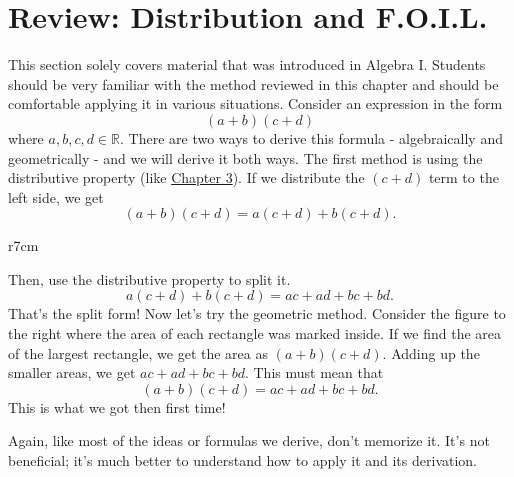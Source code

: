 \documentclass[lang=en,11pt]{elegantbook}
\begin{document}
\section{Review: Distribution and F.O.I.L.}
\noindent This section solely covers material that was introduced in Algebra I.  Students should be very familiar with the method reviewed in this chapter and should be comfortable applying it in various situations.  Consider an expression in the form $$(a+b)(c+d)$$ where $a,b,c,d\in\mathbb{R}$.  There are two ways to derive this formula - algebraically and geometrically - and we will derive it both ways.  The first method is using the distributive property (like \hyperlink{chapter.3}{Chapter 3}).  If we distribute the $(c+d)$ term to the left side, we get $$(a+b)(c+d)=a(c+d)+b(c+d).$$  

\begin{wrapfigure}{r}{7cm}
    \centering
{}
\end{wrapfigure}

Then, use the distributive property to split it.  $$a(c+d)+b(c+d)=ac+ad+bc+bd.$$  That's the split form!  Now let's try the geometric method.  Consider the figure to the right where the area of each rectangle was marked inside.  If we find the area of the largest rectangle, we get the area as $(a+b)(c+d)$.  Adding up the smaller areas, we get $ac+ad+bc+bd$.  This must mean that $$(a+b)(c+d)=ac+ad+bc+bd.$$  This is what we got then first time!

\begin{remark}
Again, like most of the ideas or formulas we derive, don't memorize it.  It's not beneficial; it's much better to understand how to apply it and its derivation.
\end{remark}
\end{document}
